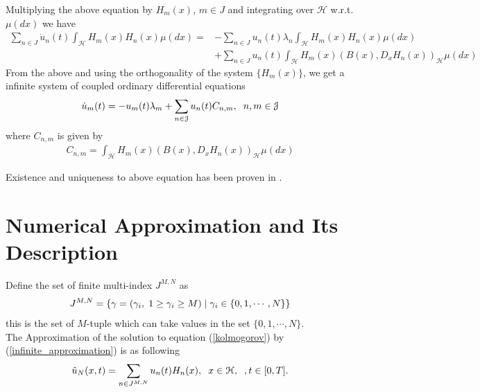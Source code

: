     Multiplying the above equation by $H_m (x)$, $m \in J$ and integrating over $\mathcal{H}$ w.r.t. $\mu(dx)$ we have
    \begin{align*}
    	\displaystyle \sum_{n \in J}  \dot{u}_n (t) \int_{\mathcal{H}} H_m (x) H_n (x) \mu (dx) = &- \sum_{n \in J} u_n (t) \lambda_n \int_{\mathcal{H}} H_m (x)  H_n (x) \mu (dx) \\
    	&+ \sum_{n \in J} u_n (t) \int_{\mathcal{H}} H_m (x) \left( B(x), D_x H_n (x) \right)_{\mathcal{H}} \mu (dx)
    \end{align*}
    From the above and using the orthogonality of the system $\{H_m (x) \}$, we get a infinite system of coupled ordinary differential equations
    \begin{align}
    \label{infinite_system}
        \dot{u}_{m} (t) = -u_{m} (t) \lambda_{m} + \displaystyle \sum _{n \in \mathcal{J}} u_{n} (t) C_{n, m} , \hspace{2mm} n, m \in \mathcal{J}	
    \end{align}
    where $C_{n, m}$ is given by
    \begin{align}
    \label{Cnm}
    	C_{n, m} = \displaystyle  \int_{\mathcal{H}} H_m (x) \left( B(x), D_x H_n (x) \right)_{\mathcal{H}} \mu (dx)
    \end{align}
    
    \noindent Existence and uniqueness to above equation has been proven in \cite{Delgado2016}.
    
    \section{Numerical Approximation and Its Description}
    Define the set of finite multi-index $J^{M, N}$ as
    	\begin{align}
    		J^{M, N} = \{\gamma = (\gamma_i, \hspace{1mm} 1 \geq \gamma_i \geq M  ) \hspace{1mm} | \hspace{1mm} \gamma_i \in \{0, 1, \cdots, N \} \}
    	\end{align}
    this is the set of $M$-tuple which can take values in the set	$\{0, 1, \cdots, N \}$.\\
    
    \noindent The Approximation of the solution to equation (\ref{kolmogorov}) by (\ref{infinite_approximation}) is as following 
    \begin{align}
    \label{finite_approximation}
    	\hat{u}_N (x, t) = \displaystyle \sum_{ n \in J^{M, N} } u_n (t) H_n (x), \hspace{2mm} x \in \mathcal{H}, \hspace{2mm}, t \in [0, T].
    \end{align}
    
